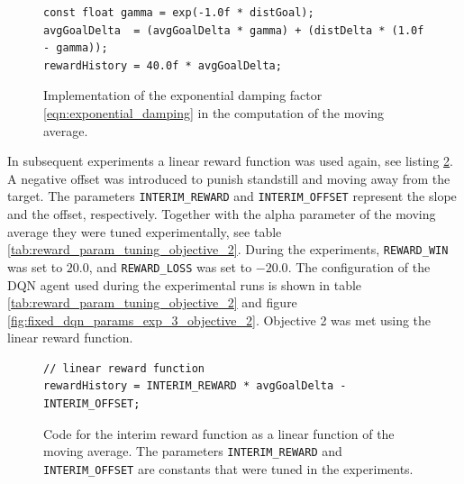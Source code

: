 \documentclass[11pt, onecolumn, oneside, reqno]{amsart}
\begin{document}
\begin{figure}[thpb]
\centering
\begin{lstlisting}
const float gamma = exp(-1.0f * distGoal);
avgGoalDelta  = (avgGoalDelta * gamma) + (distDelta * (1.0f - gamma));
rewardHistory = 40.0f * avgGoalDelta;
\end{lstlisting}
\caption{Implementation of the exponential damping factor \ref{eqn:exponential_damping} in the computation of the moving average.}
\label{fig:exponential_damping_moving_average}
\end{figure}

In subsequent experiments a linear reward function was used again, see listing \ref{fig:linear_reward_function_objective_2}. A negative offset was introduced to punish standstill and moving away from the target. The parameters \texttt{INTERIM\_REWARD} and \texttt{INTERIM\_OFFSET} represent the slope and the offset, respectively. Together with the alpha parameter of the moving average they were tuned experimentally, see table \ref{tab:reward_param_tuning_objective_2}. During the experiments, \texttt{REWARD\_WIN} was set to $20.0$, and \texttt{REWARD\_LOSS} was set to $-20.0$.  The configuration of the DQN agent used during the experimental runs is shown in table \ref{tab:reward_param_tuning_objective_2} and figure \ref{fig:fixed_dqn_params_exp_3_objective_2}. Objective 2 was met using the linear reward function.

\begin{figure}[thpb]
\centering
\begin{lstlisting}
// linear reward function
rewardHistory = INTERIM_REWARD * avgGoalDelta - INTERIM_OFFSET;
\end{lstlisting}
\caption{Code for the interim reward function as a linear function of the moving average. The parameters \texttt{INTERIM\_REWARD} and \texttt{INTERIM\_OFFSET} are constants that were tuned in the experiments.}
\label{fig:linear_reward_function_objective_2}
\end{figure}
\end{document}
